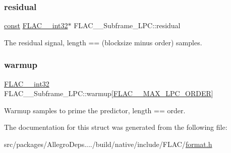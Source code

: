 \subsubsection{\texorpdfstring{residual}{residual}}
{\footnotesize\ttfamily \hyperlink{zconf_8h_a2c212835823e3c54a8ab6d95c652660e}{const} \hyperlink{ordinals_8h_a33fd77bfe6d685541a0c034a75deccdc}{F\+L\+A\+C\+\_\+\+\_\+int32}$\ast$ F\+L\+A\+C\+\_\+\+\_\+\+Subframe\+\_\+\+L\+P\+C\+::residual}

The residual signal, length == (blocksize minus order) samples. \mbox{\label{struct_f_l_a_c_____subframe___l_p_c_a91c6c71c6fc2b812da1d2a3761e29807}} 
\subsubsection{\texorpdfstring{warmup}{warmup}}
{\footnotesize\ttfamily \hyperlink{ordinals_8h_a33fd77bfe6d685541a0c034a75deccdc}{F\+L\+A\+C\+\_\+\+\_\+int32} F\+L\+A\+C\+\_\+\+\_\+\+Subframe\+\_\+\+L\+P\+C\+::warmup\mbox{[}\hyperlink{group__flac__format_ga16108d413f524329f338cff6e05f3aff}{F\+L\+A\+C\+\_\+\+\_\+\+M\+A\+X\+\_\+\+L\+P\+C\+\_\+\+O\+R\+D\+ER}\mbox{]}}

Warmup samples to prime the predictor, length == order. 

The documentation for this struct was generated from the following file\+:\begin{DoxyCompactItemize}
\item 
src/packages/\+Allegro\+Deps..../build/native/include/\+F\+L\+A\+C/\hyperlink{format_8h}{format.\+h}\end{DoxyCompactItemize}
